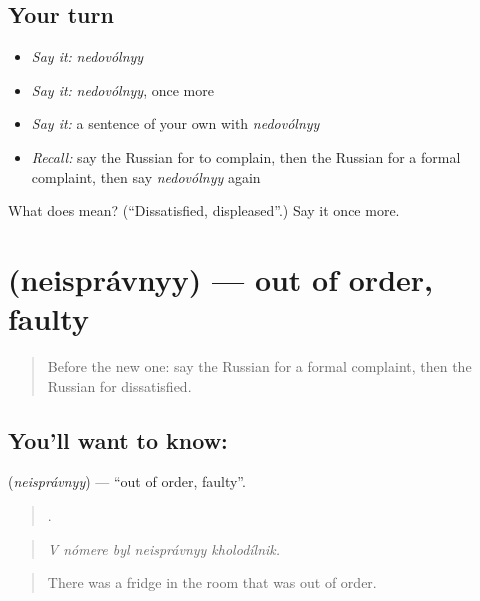 \subsection*{Your turn}
\begin{itemize}
\raggedright
  \item \emph{Say it:} \emph{nedovólnyy}
  \item \emph{Say it:} \emph{nedovólnyy}, once more
  \item \emph{Say it:} a sentence of your own with \emph{nedovólnyy}
  \item \emph{Recall:} say the Russian for to complain, then the Russian for a formal complaint, then say \emph{nedovólnyy} again
\end{itemize}

\begin{tcolorbox}[breakable,colback=teal!4,colframe=teal!35!black,title={Before you move on}]
What does  mean? (\textquotedblleft{}Dissatisfied, displeased\textquotedblright{}.) Say it once more.
\end{tcolorbox}
\section[\texorpdfstring{\ru{неисправный} (neisprávnyy)}{неисправный (neisprávnyy)}]{ (neisprávnyy) — out of order, faulty}

\label{lesson:RU-C434-neispravnyy}



\begin{quote}
Before the new one: say the Russian for a formal complaint, then the Russian for dissatisfied.
\end{quote}

\subsection*{You'll want to know: }
\textbf{} (\emph{neisprávnyy}) — \textquotedblleft{}out of order, faulty\textquotedblright{}.

\begin{quote}
    .
\end{quote}

\begin{quote}
\emph{V nómere byl neisprávnyy kholodílnik.}
\end{quote}

\begin{quote}
There was a fridge in the room that was out of order.
\end{quote}

